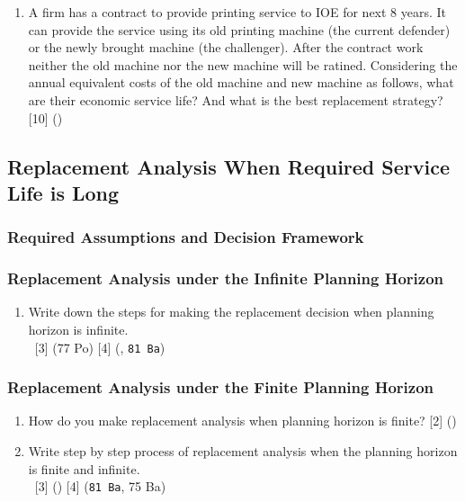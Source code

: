 \documentclass[12pt]{article}
\newcommand{\enter}{\\\textcolor{white}{1}}
\begin{document}
\begin{enumerate}
			\item A firm has a contract to provide printing service to IOE for next 8 years. It can provide the service using its old printing machine (the current defender) or the newly brought machine (the challenger). After the contract work neither the old machine nor the new machine will be ratined. Considering the annual equivalent costs of the old machine and new machine as follows, what are their economic service life? And what is the best replacement strategy? \hfill [10] ()
		\end{enumerate}

	\subsection{Replacement Analysis When Required Service Life is Long}

		\subsubsection{Required Assumptions and Decision Framework}

		\subsubsection{Replacement Analysis under the Infinite Planning Horizon}
			\begin{enumerate}
				\item Write down the steps for making the replacement decision when planning horizon is infinite.
				\enter\hfill [3] (77 Po) [4] (, \texttt{81 Ba})
			\end{enumerate}

		\subsubsection{Replacement Analysis under the Finite Planning Horizon}
			\begin{enumerate}
				\item How do you make replacement analysis when planning horizon is finite? \hfill [2] ()

				\item Write step by step process of replacement analysis when the planning horizon is finite and infinite.
				\enter\hfill [3] () [4] (\texttt{81 Ba}, 75 Ba)
			\end{enumerate}
\end{document}
